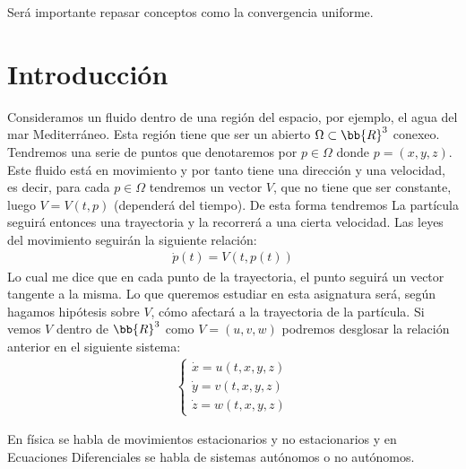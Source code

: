 Será importante repasar conceptos como la convergencia uniforme.

\chapter*{Introducción}

Consideramos un fluido dentro de una región del espacio, por ejemplo, el agua del mar Mediterráneo. Esta región tiene que ser un abierto $\Omega\subset \bb{R}^3$ conexeo. Tendremos una serie de puntos que denotaremos por $p\in \Omega$ donde $p=(x,y,z)$. Este fluido está en movimiento y por tanto tiene una dirección y una velocidad, es decir, para cada $p\in \Omega$ tendremos un vector $V$, que no tiene que ser constante, luego $V=V(t,p)$ (dependerá del tiempo). De esta forma tendremos 
La partícula seguirá entonces una trayectoria y la recorrerá a una cierta velocidad. Las leyes del movimiento seguirán la siguiente relación:
\begin{gather*}
    \dot{p}(t) = V(t,p(t))
\end{gather*}
Lo cual me dice que en cada punto de la trayectoria, el punto seguirá un vector tangente a la misma. Lo que queremos estudiar en esta asignatura será, según hagamos hipótesis sobre $V$, cómo afectará a la trayectoria de la partícula. Si vemos $V$ dentro de $\bb{R}^3$ como $V = (u,v,w)$ podremos desglosar la relación anterior en el siguiente sistema:
\begin{gather*}
    \left\{
        \begin{array}{l}
            \dot{x} = u(t,x,y,z)\\
            \dot{y} = v(t,x,y,z)\\
            \dot{z} = w(t,x,y,z)
        \end{array}
    \right.
\end{gather*}

En física se habla de movimientos estacionarios y no estacionarios y en Ecuaciones Diferenciales se habla de sistemas autónomos o no autónomos.

